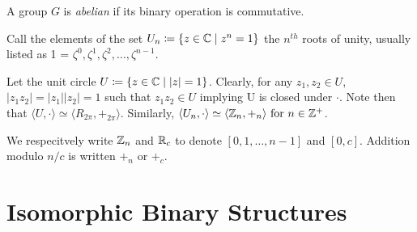 \begin{definition}
    A group $G$ is \textit{abelian} if its binary operation is commutative. 
\end{definition}
\begin{definition}
    Call the elements of the set $U_n \coloneq \{ z \in \mathbb{C} \mid z^n = 1\}$ the $n^{th}$ roots of unity, usually listed as 1 = $\zeta^0, \zeta^1, \zeta^2, \ldots, \zeta^{n-1}$.
\end{definition}
\begin{remark}
    Let the unit circle $U \coloneq \{z \in \mathbb{C} \mid |z| = 1\}$. Clearly, for any $z_1, z_2 \in U$, $|z_1z_2| = |z_1||z_2| = 1$ such that $z_1z_2 \in U$ implying U is closed under $\cdot$. Note then that $\langle U, \cdot \rangle \simeq \langle R_{2\pi}, +_{2\pi} \rangle$. Similarly, $\langle U_n, \cdot \rangle \simeq \langle \mathbb{Z}_n, +_n \rangle \text{ for } n \in \mathbb{Z}^+$.
\end{remark}
\begin{definition}
    We respecitvely write $\mathbb{Z}_n$ and $\mathbb{R}_c$ to denote $[0, 1, \ldots, n-1]$ and $[0, c]$. Addition modulo $n/c$ is written $+_n$ or ${+_c}$.
\end{definition}

\section{Isomorphic Binary Structures}


